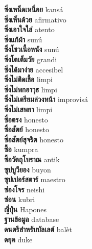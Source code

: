 \textbf{ ซึ่งเหน็ดเหนื่อย  } kansá \\
\textbf{ ซึ่งเห็นด้วย  } afirmativo \\
\textbf{ ซึ่งเอาใจใส่  } atento \\
\textbf{ ซึ่งแก้ผ้า  } sunú \\
\textbf{ ซึ่งโชวเนื้อหนัง  } sunú \\
\textbf{ ซึ่งโตเต็มวัย  } grandi \\
\textbf{ ซึ่งได้มาง่าย  } accesibel \\
\textbf{ ซึ่งไม่ติดเชื้อ  } limpi \\
\textbf{ ซึ่งไม่พกอาวุธ  } limpi \\
\textbf{ ซึ่งไม่เตรียมล่วงหน้า  } improvisá \\
\textbf{ ซึ่งไม่เสพยา  } limpi \\
\textbf{ ซื่อตรง  } honesto \\
\textbf{ ซื่อสัตย์  } honesto \\
\textbf{ ซื่อสัตย์สุจริต  } honesto \\
\textbf{ ซื้อ  } kumpra \\
\textbf{ ซื้อวัตถุโบราณ  } antik \\
\textbf{ ซุปบูวียอง  } buyon \\
\textbf{ ซุปเปอร์สตาร์  } maestro \\
\textbf{ ซ่องโจร  } neishi \\
\textbf{ ซ่อน  } kubri \\
\textbf{ ญี่ปุ่น  } Hapones \\
\textbf{ ฐานข้อมูล  } database \\
\textbf{ ดนตรีสำหรับบัลเลต์  } balèt \\
\textbf{ ดยุค  } duke \\
